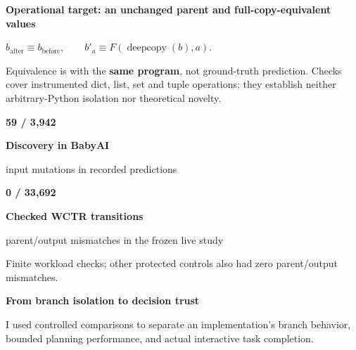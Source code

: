 \documentclass[10pt]{article}
\begin{document}
\vspace{5pt}
\colorbox{TealPale}{\begin{minipage}{\dimexpr\linewidth-2\fboxsep\relax}
  \centering
  {\fontsize{10}{13}\selectfont\bfseries\color{Navy}Operational target: an unchanged parent and full-copy-equivalent values\par}
  \vspace{4pt}
  $\displaystyle b_{\mathrm{after}}\equiv b_{\mathrm{before}},
  \qquad b'_a\equiv F\!\left(\operatorname{deepcopy}(b),a\right).$
\end{minipage}}\par
\vspace{3pt}
Equivalence is with the \textbf{same program}, not ground-truth prediction.
Checks cover instrumented dict, list, set and tuple operations; they establish
neither arbitrary-Python isolation nor theoretical novelty.

\vspace{5pt}
\colorbox{Pale}{\begin{minipage}{\dimexpr\linewidth-2\fboxsep\relax}
  \begin{minipage}[t]{.46\linewidth}
    {\fontsize{19}{22}\selectfont\bfseries\color{Teal}59 / 3,942\par}
    {\fontsize{10.2}{13}\selectfont\textbf{Discovery in BabyAI}\par}
    {\fontsize{10}{13}\selectfont input mutations in recorded predictions\par}
  \end{minipage}\hfill
  \begin{minipage}[t]{.51\linewidth}
    {\fontsize{19}{22}\selectfont\bfseries\color{Navy}0 / 33,692\par}
    {\fontsize{10.2}{13}\selectfont\textbf{Checked WCTR transitions}\par}
    {\fontsize{10}{13}\selectfont parent/output mismatches in the frozen live study\par}
  \end{minipage}\par
  \vspace{4pt}
  {\fontsize{9.6}{12.5}\selectfont\color{Muted}
  Finite workload checks; other protected controls also had zero parent/output mismatches.\par}
\end{minipage}}\par

\newpage
{}
\vspace{4pt}
{\fontsize{22}{26}\selectfont\bfseries\color{Navy}
From branch isolation to decision trust\par}
\vspace{4pt}
I used controlled comparisons to separate an implementation's branch behavior,
bounded planning performance, and actual interactive task completion.
\end{document}
